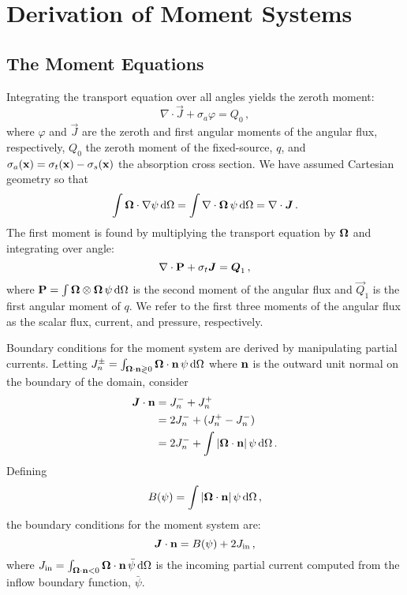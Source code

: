 \documentclass[../doc.tex]{subfiles}
\begin{document}
\section{Derivation of Moment Systems}
\subsection{The Moment Equations}
Integrating the transport equation over all angles yields the zeroth moment: 
	\begin{equation}
		\nabla\cdot\vec{J} + \sigma_a \varphi = Q_0 \,,
	\end{equation}
where $\varphi$ and $\vec{J}$ are the zeroth and first angular moments of the angular flux, respectively, $Q_0$ the zeroth moment of the fixed-source, $q$, and $\sigma_a(\x) = \sigma_t(\x) - \sigma_s(\x)$ the absorption cross section. 
We have assumed Cartesian geometry so that
	\begin{equation}
		\int \Omegahat\cdot\nabla\psi \ud \Omega = \int \nabla\cdot\Omegahat\,\psi \ud \Omega = \nabla\cdot \vec{J} \,. 
	\end{equation}
The first moment is found by multiplying the transport equation by $\Omegahat$ and integrating over angle: 
	\begin{equation}
		\nabla\cdot\P + \sigma_t \vec{J} = \vec{Q}_1 \,, 
	\end{equation}
where $\P = \int \Omegahat\otimes\Omegahat\, \psi \ud \Omega$ is the second moment of the angular flux and $\vec{Q}_1$ is the first angular moment of $q$. We refer to the first three moments of the angular flux as the scalar flux, current, and pressure, respectively. 

Boundary conditions for the moment system are derived by manipulating partial currents. Letting $J_n^\pm = \int_{\Omegahat\cdot\n\gtrless 0} \Omegahat\cdot\n\, \psi \ud \Omega$ where $\n$ is the outward unit normal on the boundary of the domain, consider 
	\begin{equation}
	\begin{aligned}
		\vec{J}\cdot\n &= J_n^- + J_n^+ \\
		&= 2 J_n^- + (J_n^+ - J_n^-) \\
		&= 2 J_n^- + \int |\Omegahat\cdot\n|\,\psi \ud \Omega \,. 
	\end{aligned}
	\end{equation}
Defining
	\begin{equation}
		B(\psi) = \int |\Omegahat\cdot\n|\, \psi \ud \Omega \,,
	\end{equation}
the boundary conditions for the moment system are: 
	\begin{equation}
		\vec{J}\cdot\n = B(\psi) + 2\Jin \,,
	\end{equation}
where $\Jin = \int_{\Omegahat\cdot\n<0} \Omegahat\cdot\n\, \bar{\psi}\ud\Omega$ is the incoming partial current computed from the inflow boundary function, $\bar{\psi}$. 
\end{document}
